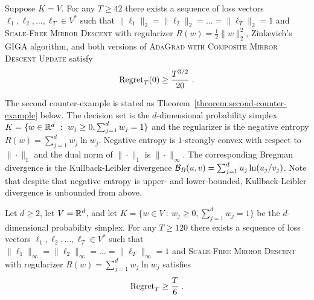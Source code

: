 \begin{theorem}
\label{theorem:first-counter-example}
Suppose $K = V$. For any $T \ge 42$ there exists a sequence of loss vectors
$\ell_1, \ell_2, \dots, \ell_T \in V^*$ such that $\|\ell_1\|_2 = \|\ell_2\|_2
= \dots = \|\ell_T\|_2 = 1$ and \textsc{Scale-Free Mirror Descent} with
regularizer $R(w) = \frac{1}{2}\|w\|_2^2$, Zinkevich's \textsc{GIGA} algorithm,
and both versions of \textsc{AdaGrad with Composite Mirror Descent Update}
satisfy
$$
\operatorname{Regret}_T(0) \ge \frac{T^{3/2}}{20} \; .
$$
\end{theorem}

The second counter-example is stated as Theorem~\ref{theorem:second-counter-example}
below.  The decision set is the $d$-dimensional probability simplex $K = \{ w
\in \mathbb{R}^d ~:~ w_j \ge 0, \sum_{j=1}^d w_j = 1 \}$ and the regularizer is the
negative entropy $R(w) = \sum_{j=1}^d w_j \ln w_j$.  Negative entropy is
$1$-strongly convex with respect to $\|\cdot\|_1$ and the dual norm of
$\|\cdot\|_1$ is \mbox{$\|\cdot\|_\infty$}.  The corresponding Bregman
divergence is the Kullback-Leibler divergence $\mathcal{B}_R(u,v) = \sum_{j=1}^d u_j
\ln(u_j/v_j)$.  Note that despite that negative entropy is upper- and
lower-bounded, Kullback-Leibler divergence is unbounded from above.

\begin{theorem}
\label{theorem:second-counter-example}
Let $d \ge 2$, let $V = \mathbb{R}^d$, and let $K = \{ w \in V ~:~ w_j \ge 0, \sum_{j=1}^d w_j = 1 \}$
be the $d$-dimensional probability simplex.  For any $T \ge 120$
there exists a sequence of loss vectors $\ell_1, \ell_2, \dots, \ell_T \in V^*$
such that $\|\ell_1\|_\infty = \|\ell_2\|_\infty = \dots = \|\ell_T\|_\infty =
1$ and \textsc{Scale-Free Mirror Descent} with regularizer $R(w) = \sum_{j=1}^d
w_j \ln w_j$ satisfies
$$
\operatorname{Regret}_T \ge \frac{T}{6} \; .
$$
\end{theorem}
